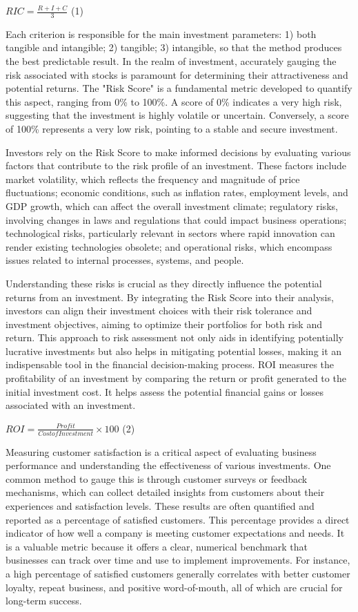 {\(RIC = \frac{R + I + C}{3}\) (1)

Each criterion is responsible for the main investment parameters: 1)
both tangible and intangible; 2) tangible; 3) intangible, so that the
method produces the best predictable result. In the realm of investment,
accurately gauging the risk associated with stocks is paramount for
determining their attractiveness and potential returns. The "Risk Score"
is a fundamental metric developed to quantify this aspect, ranging from
0\% to 100\%. A score of 0\% indicates a very high risk, suggesting that
the investment is highly volatile or uncertain. Conversely, a score of
100\% represents a very low risk, pointing to a stable and secure
investment.

Investors rely on the Risk Score to make informed decisions by
evaluating various factors that contribute to the risk profile of an
investment. These factors include market volatility, which reflects the
frequency and magnitude of price fluctuations; economic conditions, such
as inflation rates, employment levels, and GDP growth, which can affect
the overall investment climate; regulatory risks, involving changes in
laws and regulations that could impact business operations;
technological risks, particularly relevant in sectors where rapid
innovation can render existing technologies obsolete; and operational
risks, which encompass issues related to internal processes, systems,
and people.

Understanding these risks is crucial as they directly influence the
potential returns from an investment. By integrating the Risk Score into
their analysis, investors can align their investment choices with their
risk tolerance and investment objectives, aiming to optimize their
portfolios for both risk and return. This approach to risk assessment
not only aids in identifying potentially lucrative investments but also
helps in mitigating potential losses, making it an indispensable tool in
the financial decision-making process. ROI measures the profitability of
an investment by comparing the return or profit generated to the initial
investment cost. It helps assess the potential financial gains or losses
associated with an investment.

\(ROI = \frac{Profit}{CostofInvestment} \times 100\) (2)

Measuring customer satisfaction is a critical aspect of evaluating
business performance and understanding the effectiveness of various
investments. One common method to gauge this is through customer surveys
or feedback mechanisms, which can collect detailed insights from
customers about their experiences and satisfaction levels. These results
are often quantified and reported as a percentage of satisfied
customers. This percentage provides a direct indicator of how well a
company is meeting customer expectations and needs. It is a valuable
metric because it offers a clear, numerical benchmark that businesses
can track over time and use to implement improvements. For instance, a
high percentage of satisfied customers generally correlates with better
customer loyalty, repeat business, and positive word-of-mouth, all of
which are crucial for long-term success.

}
